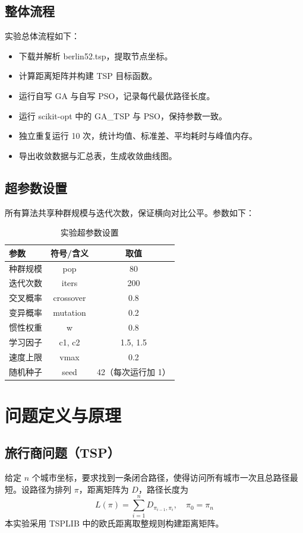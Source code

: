 \documentclass[runningheads]{ctexart}
\begin{document}
\subsection{整体流程}
实验总体流程如下：
\begin{itemize}
	\item 下载并解析 berlin52.tsp，提取节点坐标。
	\item 计算距离矩阵并构建 TSP 目标函数。
	\item 运行自写 GA 与自写 PSO，记录每代最优路径长度。
	\item 运行 scikit-opt 中的 GA\_TSP 与 PSO，保持参数一致。
	\item 独立重复运行 10 次，统计均值、标准差、平均耗时与峰值内存。
	\item 导出收敛数据与汇总表，生成收敛曲线图。
\end{itemize}

\subsection{超参数设置}
所有算法共享种群规模与迭代次数，保证横向对比公平。参数如下：
\begin{table}[H]
	\centering
	\caption{实验超参数设置}
	\label{tab:params}
	\begin{tabular}{lcc}
		\toprule
		参数 & 符号/含义 & 取值 \\
		\midrule
		种群规模 & pop & 80 \\
		迭代次数 & iters & 200 \\
		交叉概率 & crossover & 0.8 \\
		变异概率 & mutation & 0.2 \\
		惯性权重 & w & 0.8 \\
		学习因子 & c1, c2 & 1.5, 1.5 \\
		速度上限 & vmax & 0.2 \\
		随机种子 & seed & 42（每次运行加 1） \\
		\bottomrule
	\end{tabular}
\end{table}

\section{问题定义与原理}
\subsection{旅行商问题（TSP）}
给定 $n$ 个城市坐标，要求找到一条闭合路径，使得访问所有城市一次且总路径最短。设路径为排列 $\pi$，距离矩阵为 $D$，路径长度为
\begin{equation}
	L(\pi) = \sum_{i=1}^{n} D_{\pi_{i-1},\pi_i}, \quad \pi_0=\pi_n
\end{equation}
本实验采用 TSPLIB 中的欧氏距离取整规则构建距离矩阵。
\end{document}
